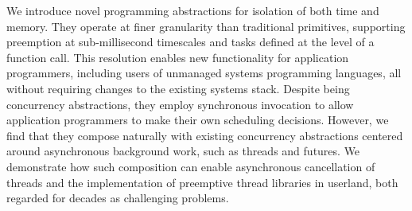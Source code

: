 We introduce novel programming abstractions for isolation of both time and memory.
They operate at finer granularity than traditional primitives, supporting preemption
at sub-millisecond timescales and tasks defined at the level of a function call.
This resolution enables new functionality for application programmers, including
users of unmanaged systems programming languages, all without requiring changes to
the existing systems stack.  Despite being concurrency abstractions, they employ
synchronous invocation to allow application programmers to make their own scheduling
decisions.  However, we find that they compose naturally with existing concurrency
abstractions centered around asynchronous background work, such as threads and
futures.  We demonstrate how such composition can enable asynchronous cancellation of
threads and the implementation of preemptive thread libraries in userland, both
regarded for decades as challenging problems.
